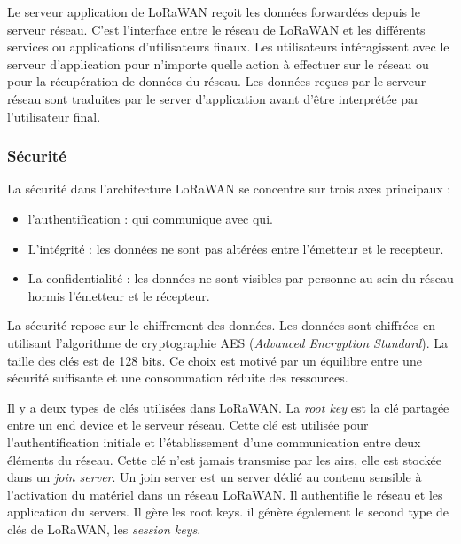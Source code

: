 \vspace{0.1cm}

Le serveur application de LoRaWAN reçoit les données forwardées depuis le serveur réseau. C'est l'interface entre le réseau de LoRaWAN et les différents services ou applications d'utilisateurs finaux. Les utilisateurs intéragissent avec le serveur d'application pour n'importe quelle action à effectuer sur le réseau ou pour la récupération de données du réseau. Les données reçues par le serveur réseau sont traduites par le server d'application avant d'être interprétée par l'utilisateur final.

\subsubsection{Sécurité}

La sécurité dans l'architecture LoRaWAN se concentre sur trois axes principaux :

\begin{itemize}
\item l'authentification : qui communique avec qui.
\item L'intégrité : les données ne sont pas altérées entre l'émetteur et le recepteur.
\item La confidentialité : les données ne sont visibles par personne au sein du réseau hormis l'émetteur et le récepteur. 
\end{itemize}

\vspace{0.1cm}

La sécurité repose sur le chiffrement des données. Les données sont chiffrées en utilisant l'algorithme de cryptographie AES (\textit{Advanced Encryption Standard}). La taille des clés est de 128 bits. Ce choix est motivé par un équilibre entre une sécurité suffisante et une consommation réduite des ressources\cite{loraes}.

\vspace{0.1cm}

Il y a deux types de clés utilisées dans LoRaWAN. La \textit{root key} est la clé partagée entre un end device et le serveur réseau. Cette clé est utilisée pour l'authentification initiale et l'établissement d'une communication entre deux éléments du réseau. Cette clé n'est jamais transmise par les airs, elle est stockée dans un \textit{join server}. Un join server est un server dédié au contenu sensible à l'activation du matériel dans un réseau LoRaWAN. Il authentifie le réseau et les application du servers. Il gère les root keys. il génère également le second type de clés de LoRaWAN, les \textit{session keys}.

